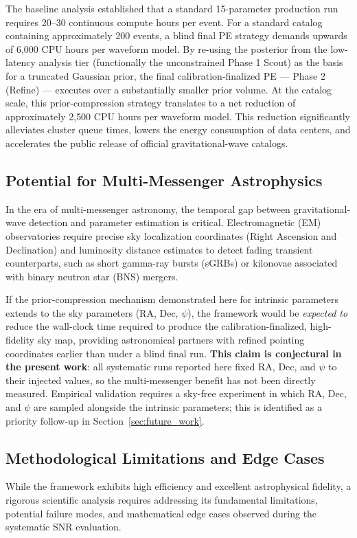 \documentclass[12pt]{article}
\begin{document}
The baseline analysis established that a standard 15-parameter production run requires 20--30 continuous compute hours per event. For a standard catalog containing approximately 200 events, a blind final PE strategy demands upwards of 6{,}000 CPU hours per waveform model. By re-using the posterior from the low-latency analysis tier (functionally the unconstrained Phase 1 Scout) as the basis for a truncated Gaussian prior, the final calibration-finalized PE — Phase 2 (Refine) — executes over a substantially smaller prior volume. At the catalog scale, this prior-compression strategy translates to a net reduction of approximately 2{,}500 CPU hours per waveform model. This reduction significantly alleviates cluster queue times, lowers the energy consumption of data centers, and accelerates the public release of official gravitational-wave catalogs.

\subsection{Potential for Multi-Messenger Astrophysics}
In the era of multi-messenger astronomy, the temporal gap between gravitational-wave detection and parameter estimation is critical. Electromagnetic (EM) observatories require precise sky localization coordinates (Right Ascension and Declination) and luminosity distance estimates to detect fading transient counterparts, such as short gamma-ray bursts (sGRBs) or kilonovae associated with binary neutron star (BNS) mergers.

If the prior-compression mechanism demonstrated here for intrinsic parameters extends to the sky parameters (RA, Dec, $\psi$), the framework would be \emph{expected to} reduce the wall-clock time required to produce the calibration-finalized, high-fidelity sky map, providing astronomical partners with refined pointing coordinates earlier than under a blind final run. \textbf{This claim is conjectural in the present work}: all systematic runs reported here fixed RA, Dec, and $\psi$ to their injected values, so the multi-messenger benefit has not been directly measured. Empirical validation requires a sky-free experiment in which RA, Dec, and $\psi$ are sampled alongside the intrinsic parameters; this is identified as a priority follow-up in Section~\ref{sec:future_work}.

\subsection{Methodological Limitations and Edge Cases}
\label{sec:limitations}
While the framework exhibits high efficiency and excellent astrophysical fidelity, a rigorous scientific analysis requires addressing its fundamental limitations, potential failure modes, and mathematical edge cases observed during the systematic SNR evaluation.
\end{document}
